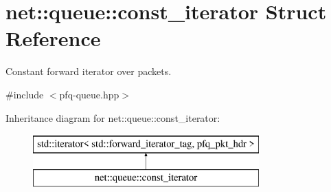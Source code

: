 \hypertarget{structnet_1_1queue_1_1const__iterator}{\section{net\-:\-:queue\-:\-:const\-\_\-iterator Struct Reference}
\label{structnet_1_1queue_1_1const__iterator}
}


Constant forward iterator over packets.  




{\ttfamily \#include $<$pfq-\/queue.\-hpp$>$}

Inheritance diagram for net\-:\-:queue\-:\-:const\-\_\-iterator\-:\begin{figure}[H]
\begin{center}
\leavevmode
\includegraphics[height=2.000000cm]{structnet_1_1queue_1_1const__iterator}
\end{center}
\end{figure}
